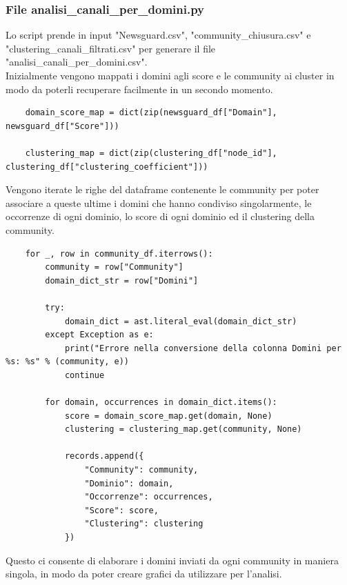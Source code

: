 \documentclass[12pt]{article}
\begin{document}
	\subsubsection{File analisi\_canali\_per\_domini.py}
	Lo script prende in input "Newsguard.csv", "community\_chiusura.csv" e "clustering\_canali\_filtrati.csv" per generare il file "analisi\_canali\_per\_domini.csv".\\
	Inizialmente vengono mappati i domini agli score e le community ai cluster in modo da poterli recuperare facilmente in un secondo momento.
	\begin{lstlisting}
	domain_score_map = dict(zip(newsguard_df["Domain"], newsguard_df["Score"]))
	
	clustering_map = dict(zip(clustering_df["node_id"], clustering_df["clustering_coefficient"]))
	\end{lstlisting}
	Vengono iterate le righe del dataframe contenente le community per poter associare a queste ultime i domini che hanno condiviso singolarmente, le occorrenze di ogni dominio, lo score di ogni dominio ed il clustering della community.
	
	\begin{lstlisting}
	for _, row in community_df.iterrows():
		community = row["Community"]
		domain_dict_str = row["Domini"]
		
		try:
			domain_dict = ast.literal_eval(domain_dict_str)
		except Exception as e:
			print("Errore nella conversione della colonna Domini per %s: %s" % (community, e))
			continue
		
		for domain, occurrences in domain_dict.items():
			score = domain_score_map.get(domain, None) 
			clustering = clustering_map.get(community, None) 
		
			records.append({
				"Community": community,
				"Dominio": domain,
				"Occorrenze": occurrences,
				"Score": score,
				"Clustering": clustering
			})	
	\end{lstlisting}
	Questo ci consente di elaborare i domini inviati da ogni community in maniera singola, in modo da poter creare grafici da utilizzare per l'analisi.
\end{document}
